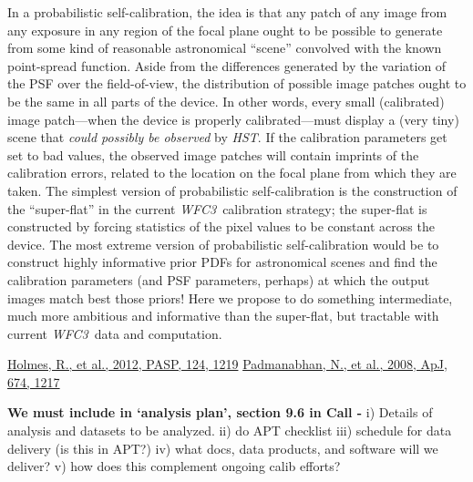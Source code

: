 \documentclass[12pt]{article}
\newcommand{\project}[1]{\textsl{#1}}
\newcommand{\HST}{\project{HST}}
\newcommand{\WFC}{\project{WFC3}}
\begin{document}
In a probabilistic self-calibration, the idea is that any patch of any
image from any exposure in any region of the focal plane ought to be
possible to generate from some kind of reasonable astronomical
``scene'' convolved with the known point-spread function.  Aside from
the differences generated by the variation of the PSF over the
field-of-view, the distribution of possible image patches ought to be
the same in all parts of the device.  In other words, every small
(calibrated) image patch---when the device is properly
calibrated---must display a (very tiny) scene that \emph{could
  possibly be observed} by \HST.  If the calibration parameters get
set to bad values, the observed image patches will contain imprints of
the calibration errors, related to the location on the focal plane
from which they are taken.  The simplest version of probabilistic
self-calibration is the construction of the ``super-flat'' in the
current \WFC\ calibration strategy; the super-flat is constructed by
forcing statistics of the pixel values to be constant across the
device.  The most extreme version of probabilistic self-calibration
would be to construct highly informative prior PDFs for astronomical
scenes and find the calibration parameters (and PSF parameters,
perhaps) at which the output images match best those priors!  Here we
propose to do something intermediate, much more ambitious and
informative than the super-flat, but tractable with current \WFC\ data
and computation.


\begin{flushleft} 
\href{http://bit.ly/15TAoYy}{Holmes, R., et al., 2012, PASP, 124,
  1219} \newline
\href{http://bit.ly/12dPkSh}{Padmanabhan, N., et al., 2008, ApJ, 674, 1217}
\end{flushleft}

%
%
\describearchival       %


{\color{red} \textbf{We must include in `analysis plan', section 9.6 in Call -} 
i) Details of analysis and datasets to be analyzed.  ii) do APT
checklist iii) schedule for data delivery (is this in APT?) iv) what
docs, data products, and software will we deliver? v) how does this 
complement ongoing calib efforts?}
\end{document}
